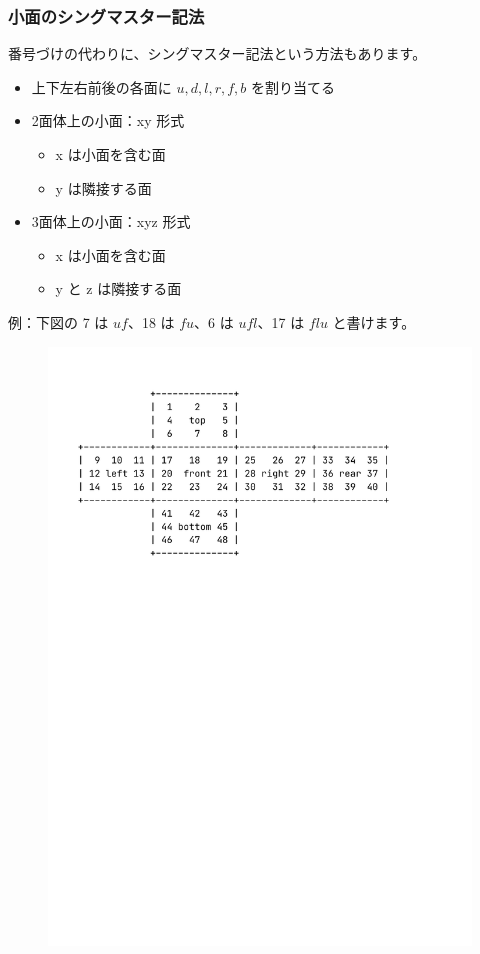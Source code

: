 \documentclass{beamer}
\begin{document}
\begin{frame}
    \frametitle{小面のシングマスター記法}

    番号づけの代わりに、シングマスター記法という方法もあります。

    \begin{itemize}
        \item 上下左右前後の各面に \(u, d, l, r, f, b\) を割り当てる
        \item 2面体上の小面：xy 形式
              \begin{itemize}
                  \item x は小面を含む面
                  \item y は隣接する面
              \end{itemize}
        \item 3面体上の小面：xyz 形式
              \begin{itemize}
                  \item x は小面を含む面
                  \item y と z は隣接する面
              \end{itemize}
    \end{itemize}

    例：下図の 7 は \(uf\)、18 は \(fu\)、6 は \(ufl\)、17 は \(flu\) と書けます。

    \begin{figure}
        \includegraphics[scale=0.3]{images/display2d.pdf}
    \end{figure}
\end{frame}
\end{document}
